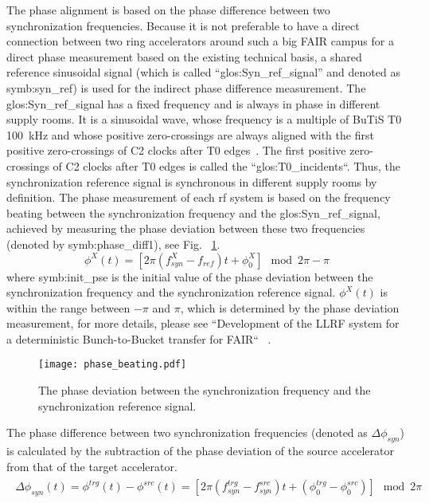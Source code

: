 The phase alignment is based on the phase difference between two synchronization frequencies. Because it is not preferable to have a direct connection between two ring accelerators around such a big FAIR campus for a direct phase measurement based on the existing technical basis, a shared reference sinusoidal signal (which is called “\gls{glos:Syn_ref_signal}” and denoted as \gls{symb:syn_ref}) is used for the indirect phase difference measurement. The \gls{glos:Syn_ref_signal} has a fixed frequency and is always in phase in different supply rooms. It is a sinusoidal wave, whose frequency is a multiple of BuTiS T0 \SI{100}{kHz} and whose positive zero-crossings are always aligned with the first positive zero-crossings of C2 clocks after T0 edges~\cite{ferrand_system_2014, ferrand_system_2015}. The first positive zero-crossings of C2 clocks after T0 edges is called the ``\gls{glos:T0_incidents}``. Thus, the synchronization reference signal is synchronous in different supply rooms by definition. The phase measurement of each rf system is based on the frequency beating between the synchronization frequency and the \gls{glos:Syn_ref_signal}, achieved by measuring the phase deviation between these two frequencies (denoted by \gls{symb:phase_diff1}), see Fig. ~\ref{phase_diffe_align}. 
\begin{equation}
\phi^X(t)= [2\pi(f_\mathit{syn}^{X}-f_\mathit{ref})t+\phi^X_0] \mod 2\pi - \pi
\end{equation}
where \gls{symb:init_pse} is the initial value of the phase deviation between the synchronization frequency and the synchronization reference signal. $\phi^X(t)$ is within the range between $-\pi$ and $\pi$, which is determined by the phase deviation measurement, for more details, please see ``Development of the LLRF system for a deterministic Bunch-to-Bucket transfer for FAIR`` ~\cite{ferrand_development_nodate}.
\begin{figure}[!htb]
   \centering   
   \texttt{[image: phase\_beating.pdf]}
   \caption{The phase deviation between the synchronization frequency and the synchronization reference signal.}
   \label{phase_diffe_align}
\end{figure}

The phase difference between two synchronization frequencies (denoted as $\Delta \phi_\mathit{syn}$) is calculated by the subtraction of the phase deviation of the source accelerator from that of the target accelerator. 
\begin{eqnarray}
\begin{aligned}
\Delta \phi_\mathit{syn}(t)
=\phi^\mathit{trg}(t)-\phi^\mathit{src}(t)=[2\pi(f_\mathit{syn}^{trg}-f_\mathit{syn}^{src})t+(\phi^\mathit{trg}_0-\phi^\mathit{src}_0)] \mod 2\pi
\label{phase_diff_dev}
\end{aligned}
\end{eqnarray}

